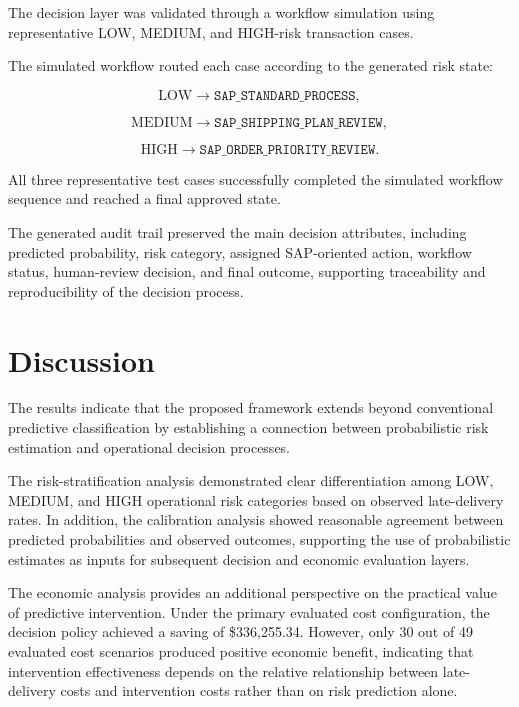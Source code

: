 \documentclass[11pt,a4paper]{article}
\begin{document}
The decision layer was validated through a workflow simulation using representative LOW, MEDIUM, and HIGH-risk transaction cases.

The simulated workflow routed each case according to the generated risk state:

\[
\mathrm{LOW}
\rightarrow
\texttt{SAP\_STANDARD\_PROCESS},
\]

\[
\mathrm{MEDIUM}
\rightarrow
\texttt{SAP\_SHIPPING\_PLAN\_REVIEW},
\]

\[
\mathrm{HIGH}
\rightarrow
\texttt{SAP\_ORDER\_PRIORITY\_REVIEW}.
\]

All three representative test cases successfully completed the simulated workflow sequence and reached a final approved state.

The generated audit trail preserved the main decision attributes, including predicted probability, risk category, assigned SAP-oriented action, workflow status, human-review decision, and final outcome, supporting traceability and reproducibility of the decision process.
\section{Discussion}

The results indicate that the proposed framework extends beyond conventional predictive classification by establishing a connection between probabilistic risk estimation and operational decision processes.

The risk-stratification analysis demonstrated clear differentiation among LOW, MEDIUM, and HIGH operational risk categories based on observed late-delivery rates. In addition, the calibration analysis showed reasonable agreement between predicted probabilities and observed outcomes, supporting the use of probabilistic estimates as inputs for subsequent decision and economic evaluation layers.

The economic analysis provides an additional perspective on the practical value of predictive intervention. Under the primary evaluated cost configuration, the decision policy achieved a saving of \$336,255.34. However, only 30 out of 49 evaluated cost scenarios produced positive economic benefit, indicating that intervention effectiveness depends on the relative relationship between late-delivery costs and intervention costs rather than on risk prediction alone.
\end{document}
